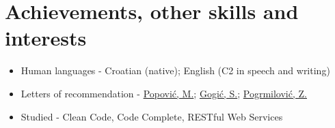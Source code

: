 \documentclass[a4paper]{article}
\begin{document}
\section{Achievements, other skills and interests}

\begin{itemize}
  \item Human languages - Croatian (native); English (C2 in speech and writing)
  \item Letters of recommendation - \href{https://github.com/MislavJaksic/Latex-Overleaf/blob/master/CV/AISoft_Popovic.pdf}{Popović, M.}; \href{https://github.com/MislavJaksic/Latex-Overleaf/blob/master/CV/Atos_Gogic.pdf}{Gogić, S.}; \href{https://github.com/MislavJaksic/Latex-Overleaf/blob/master/CV/Atos_Pogrmilovic.pdf}{Pogrmilović, Z.}
  \item Studied - Clean Code, Code Complete, RESTful Web Services
\end{itemize}
\end{document}
